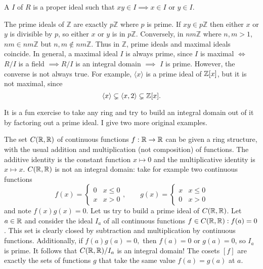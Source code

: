 \begin{definition}
A  $I$ of $R$ is a proper ideal such that $xy\in I\implies x\in I$ or $y\in I$. 
\end{definition}

\begin{example}\label{max-is-prime}
The prime ideals of $\mathbb{Z}$ are exactly $p\mathbb{Z}$ where $p$ is prime. If $xy\in p\mathbb{Z}$ then either $x$ or $y$ is divisible by $p$, so either $x$ or $y$ is in $p\mathbb{Z}$. Conversely, in $nm\mathbb{Z}$ where $n,m>1$, $nm\in nm\mathbb{Z}$ but $n,m\not \in nm\mathbb{Z}$. Thus in $\mathbb{Z}$, prime ideals and maximal ideals coincide. In general, a maximal ideal $I$ is always prime, since $I$ is maximal $\iff$ $R/I$ is a field $\implies R/I$ is an integral domain $\implies $ $I$ is prime. However, the converse is not always true. For example, $\langle x \rangle$ is a prime ideal of $\mathbb{Z}[x]$, but it is not maximal, since $$\langle x \rangle\subsetneq \langle x,2\rangle \subsetneq \mathbb{Z}[x].$$
\end{example}
It is a fun exercise to take any ring and try to build an integral domain out of it by factoring out a prime ideal. I give two more original examples.
\begin{example}
The set $C(\mathbb{R},\mathbb{R})$ of continuous functions $f:\mathbb{R}\rightarrow \mathbb{R}$ can be given a ring structure, with the usual addition and multiplication (not composition) of functions. The additive identity is the constant function $x\mapsto 0$ and the multiplicative identity is $x\mapsto x$. $C(\mathbb{R},\mathbb{R})$ is not an integral domain: take for example two continuous functions
$$f(x)=\begin{cases} 
      0 & x\leq 0 \\
      x & x>0 
   \end{cases}, \qquad g(x)=\begin{cases} 
      x & x\leq 0 \\
      0 & x>0 
   \end{cases}
$$
and note $f(x)g(x)=0$. Let us try to build a prime ideal of $C(\mathbb{R},\mathbb{R})$. Let $a\in \mathbb{R}$ and consider the ideal $I_a$ of all continuous functions $f\in C(\mathbb{R},\mathbb{R}):f(a)=0$. This set is clearly closed by subtraction and multiplication by continuous functions. Additionally, if $f(a)g(a)=0,$ then $f(a)=0$ or $g(a)=0$, so $I_a$ is prime. It follows that $C(\mathbb{R},\mathbb{R})/I_a$ is an integral domain! The cosets $[f]$ are exactly the sets of functions $g$ that take the same value $f(a)=g(a)$ at $a$.
\end{example}

